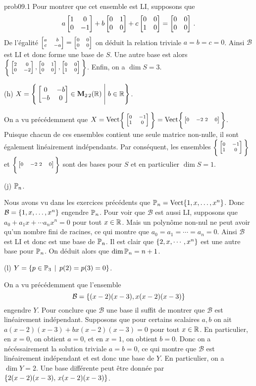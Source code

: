 \begin{sol}{prob09.1}
Pour montrer que cet ensemble est LI, supposons que 
$$a \bmatrix 1&0\\ 0&-1\endbmatrix+ b \bmatrix 0&1\\ 0&0\endbmatrix +c\bmatrix 0&0\\ 1&0\endbmatrix =\bmatrix 0&0\\ 0&0\endbmatrix\,.$$
De l'égalité $\scriptsize\bmatrix a&b\\ c&-a\endbmatrix=\bmatrix 0&0\\ 0&0\endbmatrix$ 
on déduit la relation triviale $a=b=c=0$. Ainsi $\mathcal B$ est LI et donc forme une base de $S$. Une autre base est alors  $\scriptsize\Bigg\{ \bmatrix 2&0\\ 0&-2\endbmatrix,\bmatrix 0&1\\ 0&0\endbmatrix,\bmatrix 0&0\\ 1&0\endbmatrix \Bigg\}$. Enfin, on a $\dim S=3$.
\medskip


(h)  $X=\Bigg\{  \bmatrix 0&-b\\ -b&0\endbmatrix \in \M_{2 \,2}(\R) \;\Bigg|\; b \in \R\Bigg\}$.

\soln   On a vu précédemment que $X=\text{Vect}\scriptsize\Bigg\{ \bmatrix 0&-1\\ 1&0\endbmatrix\Bigg\}=\normalsize\text{Vect}\scriptsize\Bigg\{ \bmatrix 0&-2\ 2&0\endbmatrix\Bigg\}$.  Puisque chacun de ces ensembles contient une seule matrice non-nulle, il sont également linéairement indépendants. Par conséquent, les ensembles $\scriptsize\Bigg\{ \bmatrix 0&-1\\ 1&0\endbmatrix\Bigg\}$ et $\scriptsize\Bigg\{ \bmatrix 0&-2\ 2&0\endbmatrix\Bigg\}$ sont des bases pour $S$ et en particulier $\dim S=1$. \medskip



(j) $\mathbb{P}_n$.  

\soln Nous avons vu dans les exercices précédents que $ \mathbb{P}_n=\operatorname{ Vect} \normalsize\{1,x,\dots , x^n\normalsize\} $. Donc $\mathcal B=\{1,x,\dots , x^n\}$ engendre $\mathbb{P}_n$. Pour voir que $\mathcal B$ est aussi LI, supposons que $a_0 + a_1 x +\cdots a_n x^n =0$ pour tout $x\in \mathbb{R}$. Mais un polynôme non-nul ne peut avoir qu'un nombre fini de racines, ce qui montre que $a_0=a_1=\cdots=a_n=0$. Ainsi $\mathcal B$ est LI et donc est une base de $\mathbb{P}_n$. Il est clair que $\{2,x,\cdots , x^n\}$ est une autre base pour $\mathbb{P}_n$. On d\'eduit alors que $\dim \mathbb{P}_n=n+1$. \medskip


(l)  $Y= \{p \in \mathbb{P}_3 \, \mid \,  p(2)=p(3)=0\}$. 

\soln On a vu précédemment que l'ensemble
$$\mathcal B= \{(x-2)(x-3), x(x-2)(x-3)\}$$ 
engendre $Y$. 
Pour conclure que $\mathcal B$ une base il suffit de montrer que $\mathcal B$ est linéairement indépendant. Supposons que pour certains scalaires $a,b$ on ait 
$a(x-2)(x-3)+b x(x-2)(x-3)=0$ pour tout $x\in \mathbb{R}$. 
En particulier, en $x=0$, on obtient $a=0$, et en $x=1$, on obtient $b=0$. Donc on a nécéssairement la solution triviale $a=b=0$, ce qui montre que $\mathcal B$ est linéairement indépendant et est donc une base de $Y$. En particulier, on a $\dim Y=2$. Une base différente peut \^etre donnée par $\{2(x-2)(x-3), \,x(x-2)(x-3)\}$. \medskip




\end{sol}
